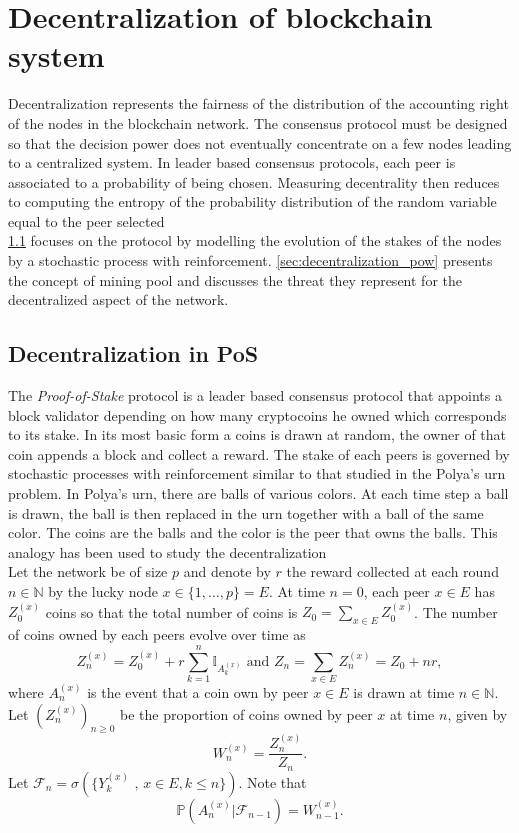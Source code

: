\chapter{Decentralization of blockchain system}\label{chap:decentralization}
Decentralization represents the fairness of the distribution of the accounting right of the nodes in the blockchain network. The consensus protocol must be designed so that the decision power does not eventually concentrate on a few nodes leading to a centralized system. In leader based consensus protocols, each peer is associated to a probability of being chosen. Measuring decentrality then reduces to computing the entropy of the probability distribution of the random variable equal to the peer selected  \\

\noindent \cref{sec:decentralization_pos} focuses on the \PoS protocol by modelling the evolution of the stakes of the nodes by a stochastic process with reinforcement. \cref{sec:decentralization_pow} presents the concept of mining pool and discusses the threat they represent for the decentralized aspect of the network.

\section{Decentralization in PoS}\label{sec:decentralization_pos}
The \textit{Proof-of-Stake} protocol is a leader based consensus protocol that appoints a block validator depending on how many cryptocoins he owned which corresponds to its stake. In its most basic form a coins is drawn at random, the owner of that coin appends a block and collect a reward. The stake of each peers is governed by stochastic processes with reinforcement similar to that studied in the Polya's urn problem. In Polya's urn, there are balls of various colors. At each time step a ball is drawn, the ball is then replaced in the urn together with a ball of the same color. The coins are the balls and the color is the peer that owns the balls. This analogy has been used to study the decentralization\\

\noindent Let the network be of size $p$ and denote by $r$ the reward collected at each round $n\in\mathbb{N}$ by the lucky node $x\in \{1, \ldots, p\} = E$. At time $n=0$, each peer $x\in E$ has $Z^{(x)}_0$ coins so that the total number of coins is $Z_0 = \sum_{x\in E}Z^{(x)}_0$. The number of coins owned by each peers evolve over time as
$$
Z^{(x)}_n = Z^{(x)}_0 + r\sum_{k = 1}^n\mathbb{I}_{A_{k}^{(x)}}\text{ and }Z_n = \sum_{x\in E}Z^{(x)}_n = Z_0 + nr,    
$$
where $A_{n}^{(x)}$ is the event that a coin own by peer $x\in E$ is drawn at time $n\in\mathbb{N}$. Let $(Z_n^{(x)})_{n\geq0}$ be the proportion of coins owned by peer $x$ at time $n$, given by 
$$
W_n^{(x)} = \frac{Z^{(x)}_n}{Z_n}. 
$$
Let $\mathcal{F}_n = \sigma(\{Y_k^{(x)}\text{ , }x\in E, k\leq n\})$. Note that 
$$
\mathbb{P}\left(A_{n}^{(x)}|\mathcal{F}_{n-1}\right) = W_{n-1}^{(x)}.
$$
